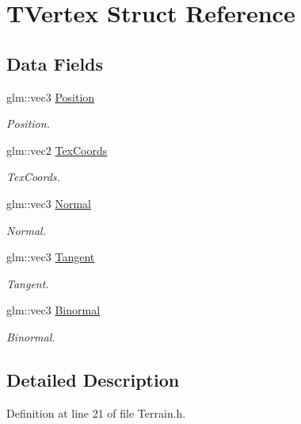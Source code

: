 \hypertarget{struct_t_vertex}{}\section{T\+Vertex Struct Reference}
\label{struct_t_vertex}
\subsection*{Data Fields}
\begin{DoxyCompactItemize}
\item 
glm\+::vec3 \hyperlink{struct_t_vertex_ac1054ca64a31d133466e8c6b8a269159}{Position}\hypertarget{struct_t_vertex_ac1054ca64a31d133466e8c6b8a269159}{}\label{struct_t_vertex_ac1054ca64a31d133466e8c6b8a269159}

\begin{DoxyCompactList}\small\item\em Position. \end{DoxyCompactList}\item 
glm\+::vec2 \hyperlink{struct_t_vertex_a937c3a7240256ad08cdc3a122b86e394}{Tex\+Coords}\hypertarget{struct_t_vertex_a937c3a7240256ad08cdc3a122b86e394}{}\label{struct_t_vertex_a937c3a7240256ad08cdc3a122b86e394}

\begin{DoxyCompactList}\small\item\em Tex\+Coords. \end{DoxyCompactList}\item 
glm\+::vec3 \hyperlink{struct_t_vertex_a5718b100dd50b7d357e978cf9752d53e}{Normal}\hypertarget{struct_t_vertex_a5718b100dd50b7d357e978cf9752d53e}{}\label{struct_t_vertex_a5718b100dd50b7d357e978cf9752d53e}

\begin{DoxyCompactList}\small\item\em Normal. \end{DoxyCompactList}\item 
glm\+::vec3 \hyperlink{struct_t_vertex_a6a2f7472942b3636a6426aa52715ddc2}{Tangent}\hypertarget{struct_t_vertex_a6a2f7472942b3636a6426aa52715ddc2}{}\label{struct_t_vertex_a6a2f7472942b3636a6426aa52715ddc2}

\begin{DoxyCompactList}\small\item\em Tangent. \end{DoxyCompactList}\item 
glm\+::vec3 \hyperlink{struct_t_vertex_ab211ffff58d214bb8c22c2729bdafa90}{Binormal}\hypertarget{struct_t_vertex_ab211ffff58d214bb8c22c2729bdafa90}{}\label{struct_t_vertex_ab211ffff58d214bb8c22c2729bdafa90}

\begin{DoxyCompactList}\small\item\em Binormal. \end{DoxyCompactList}\end{DoxyCompactItemize}


\subsection{Detailed Description}


Definition at line 21 of file Terrain.\+h.

